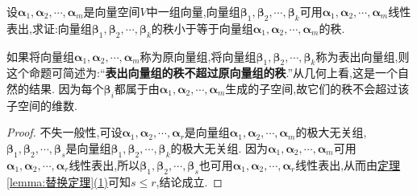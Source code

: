\documentclass[../../main.tex]{subfiles}%
\begin{document}
\begin{proposition}\label{proposition:表出向量组的秩不超过原向量组的秩}
设\(\boldsymbol{\alpha}_1,\boldsymbol{\alpha}_2,\cdots,\boldsymbol{\alpha}_m\)是向量空间\(V\)中一组向量,向量组\(\boldsymbol{\beta}_1,\boldsymbol{\beta}_2,\cdots,\boldsymbol{\beta}_k\)可用\(\boldsymbol{\alpha}_1,\boldsymbol{\alpha}_2,\cdots,\boldsymbol{\alpha}_m\)线性表出,求证:向量组\(\boldsymbol{\beta}_1,\boldsymbol{\beta}_2,\cdots,\boldsymbol{\beta}_k\)的秩小于等于向量组\(\boldsymbol{\alpha}_1,\boldsymbol{\alpha}_2,\cdots,\boldsymbol{\alpha}_m\)的秩.
\end{proposition}
\begin{remark}
如果将向量组\(\boldsymbol{\alpha}_1,\boldsymbol{\alpha}_2,\cdots,\boldsymbol{\alpha}_m\)称为原向量组,将向量组\(\boldsymbol{\beta}_1,\boldsymbol{\beta}_2,\cdots,\boldsymbol{\beta}_k\)称为表出向量组,则这个命题可简述为:“\textbf{表出向量组的秩不超过原向量组的秩}.”从几何上看,这是一个自然的结果. 因为每个\(\boldsymbol{\beta}_i\)都属于由\(\boldsymbol{\alpha}_1,\boldsymbol{\alpha}_2,\cdots,\boldsymbol{\alpha}_m\)生成的子空间,故它们的秩不会超过该子空间的维数.
\end{remark}
\begin{proof}

不失一般性,可设\(\boldsymbol{\alpha}_1,\boldsymbol{\alpha}_2,\cdots,\boldsymbol{\alpha}_r\)是向量组\(\boldsymbol{\alpha}_1,\boldsymbol{\alpha}_2,\cdots,\boldsymbol{\alpha}_m\)的极大无关组,\(\boldsymbol{\beta}_1,\boldsymbol{\beta}_2,\cdots,\boldsymbol{\beta}_s\)是向量组\(\boldsymbol{\beta}_1,\boldsymbol{\beta}_2,\cdots,\boldsymbol{\beta}_k\)的极大无关组. 因为\(\boldsymbol{\alpha}_1,\boldsymbol{\alpha}_2,\cdots,\boldsymbol{\alpha}_m\)可用\(\boldsymbol{\alpha}_1,\boldsymbol{\alpha}_2,\cdots,\boldsymbol{\alpha}_r\)线性表出,所以\(\boldsymbol{\beta}_1,\boldsymbol{\beta}_2,\cdots,\boldsymbol{\beta}_s\)也可用\(\boldsymbol{\alpha}_1,\boldsymbol{\alpha}_2,\cdots,\boldsymbol{\alpha}_r\)线性表出,从而由\hyperref[lemma:替换定理]{定理\ref{lemma:替换定理}(1)}可知\(s\leqslant  r\),结论成立.

\end{proof}
\end{document}
